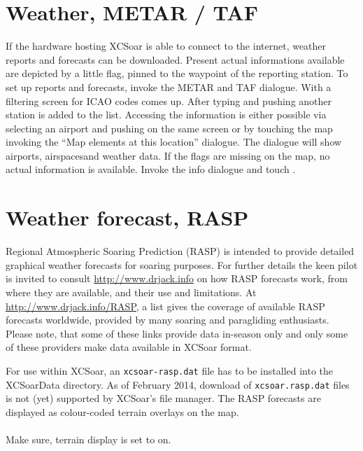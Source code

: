 \section{Weather, METAR / TAF}\label{sec:metar-taf}

If the hardware hosting XCSoar is able to connect to the internet, weather 
reports and forecasts can be downloaded.
Present actual informations available are depicted by a 
little flag, pinned to the waypoint of the reporting station. 
To set up reports and forecasts, invoke the METAR and TAF dialogue. With 
 a filtering screen for ICAO codes comes up. After typing and 
pushing  another station is added to the list. Accessing the 
information is either possible via selecting an airport and pushing 
 on the same screen or by touching the map invoking the ``Map 
elements at this location'' dialogue. The dialogue will show airports, 
airspaces\textellipsis \textellipsis{}and weather data. If the flags are missing on the map, no 
actual information is available. Invoke the info dialogue and touch 
.

\section{Weather forecast, RASP}\label{sec:weather-forecast}

Regional Atmospheric Soaring Prediction (RASP) is intended to provide
detailed graphical weather forecasts for soaring purposes. For further details 
the keen pilot is invited to consult \url{http://www.drjack.info} on how RASP 
forecasts work, from where they are available, and their use and limitations. 
At \url{http://www.drjack.info/RASP}, a list gives the coverage of available 
RASP forecasts worldwide, provided by many soaring and paragliding enthusiasts. 
Please note, that some of these links provide data in-season only and only some
of these providers make data available in XCSoar format.

For use within XCSoar, an \verb|xcsoar-rasp.dat| file has to be installed
into the XCSoarData directory.  As of February 2014, download of
\verb|xcsoar.rasp.dat| files is not (yet) supported by XCSoar's file manager. The
RASP forecasts are displayed as colour-coded terrain overlays on the map.  \\ \\
Make sure, terrain display is set to on. \tip{}  \\ \\

